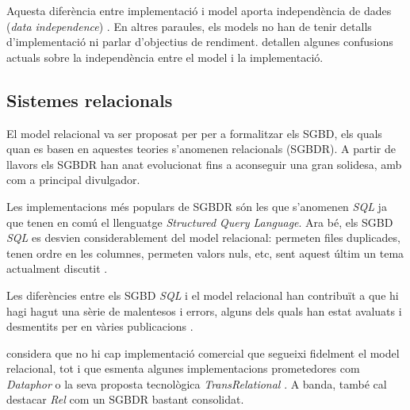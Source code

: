 Aquesta diferència entre implementació i model aporta independència de dades (\emph{data independence}) \parencite{date:dictionary}. En altres paraules, els models no han de tenir detalls d'implementació ni parlar d'objectius de rendiment. 
\textcite{dbdebunk} detallen algunes confusions actuals sobre la independència entre el model i la implementació.







\subsection{Sistemes relacionals}
\label{sec:estat:sgbdr}

El model relacional va ser proposat per \textcite{codd70} per a
formalitzar els SGBD, els quals quan es basen en aquestes teories
s'anomenen relacionals (SGBDR). A partir de llavors els SGBDR han anat
evolucionat fins a aconseguir una gran solidesa, amb
\textcite{date:introduction,date06,date:dictionary} com a principal
divulgador.



Les implementacions més populars de SGBDR són les que s'anomenen
\emph{SQL} ja que tenen en comú el llenguatge \emph{Structured Query
  Language}. Ara bé, els SGBD \emph{SQL} es desvien considerablement
del model relacional: permeten files duplicades, tenen ordre en les
columnes, permeten valors nuls, etc, sent aquest últim un tema
actualment discutit \parencite{date08:nulls}.

Les diferències entre els SGBD \emph{SQL} i el model relacional han
contribuït a que hi hagi hagut una sèrie de malentesos i
errors, alguns dels quals han estat avaluats i desmentits per
\citeauthor{dbdebunk} en vàries
publicacions \parencite{dbdebunk,date06}.
  

\textcite[cap.~2]{date06} %
considera que no hi cap implementació comercial que segueixi fidelment
el model relacional, tot i que esmenta algunes implementacions
prometedores com \emph{Dataphor} o la seva proposta tecnològica
\emph{TransRelational} \parencite{date:transrelational}. A banda,
també cal destacar \emph{Rel} \parencite{rel} com un SGBDR bastant
consolidat.



